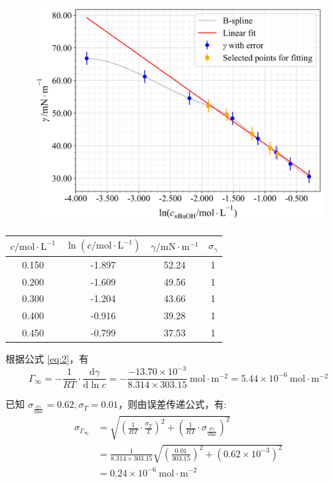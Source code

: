\begin{figure}[htbp]
    \centering
    \includegraphics[width=.8\textwidth]{figures/1-2.png}
    \label{fig:2}
\end{figure}

\begin{table}[htbp]
    \centering
    \begin{tabular}{cccc}
    \toprule
    $c / \mathrm{mol} \cdot \mathrm{L}^{-1}$ & $\ln \left(c / \mathrm{mol} \cdot \mathrm{L}^{-1}\right)$ & $\gamma / \mathrm{mN} \cdot \mathrm{m}^{-1}$ & $\sigma_\gamma$ \\
    \midrule
    0.150 & -1.897 & 52.24 & 1 \\
    0.200 & -1.609 & 49.56 & 1 \\
    0.300 & -1.204 & 43.66 & 1 \\
    0.400 & -0.916 & 39.28 & 1 \\
    0.450 & -0.799 & 37.53 & 1 \\
    \bottomrule
    \end{tabular}
    \label{tab:5}
\end{table}

根据公式 \eqref{eq:2}，有
$$
\Gamma_{\infty}=-\frac{1}{R T} \cdot \frac{\mathrm{d} \gamma}{\mathrm{d} \ln c}=-\frac{-13.70 \times 10^{-3}}{8.314 \times 303.15} \mathrm{~mol} \cdot \mathrm{m}^{-2}=5.44 \times 10^{-6} \mathrm{~mol} \cdot \mathrm{m}^{-2}
$$

已知 $\sigma_{\frac{\mathrm{d} \gamma}{\mathrm{dln} c}}=0.62, \sigma_T=0.01$，则由误差传递公式，有:
$$
\begin{aligned}
\sigma_{\Gamma_{\infty}} & =\sqrt{\left(\frac{1}{R T} \cdot \frac{\sigma_T}{T}\right)^2+\left(\frac{1}{R T} \cdot \sigma_{\frac{\mathrm{d} \gamma}{\mathrm{dln} c}}\right)^2} \\
& =\frac{1}{8.314 \times 303.15} \sqrt{\left(\frac{0.01}{303.15}\right)^2+\left(0.62 \times 10^{-3}\right)^2} \\
& =0.24 \times 10^{-6} \mathrm{~mol} \cdot \mathrm{m}^{-2}
\end{aligned}
$$

